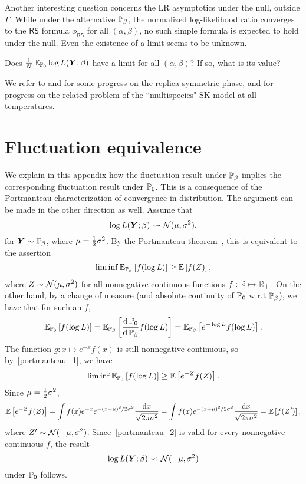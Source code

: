 \documentclass[final,12pt]{colt2018} %
\newcommand{\RS}{\mathsf{RS}} %
\newcommand{\Y}{\bm{Y}}
\begin{document}
 
 Another interesting question concerns the LR asymptotics under the null, outside $\Gamma$. While under the alternative $\P_{\beta}$, the normalized log-likelihood ratio converges to the $\RS$ formula $\phi_{\RS}$ for all $(\alpha,\beta)$, no such simple formula is expected to hold under the null. Even the existence of a limit seems to be unknown. 
\begin{question}\label{our_question}
Does $\frac{1}{N}\E_{\P_{0}}\log L(\Y;\beta)$ have a limit for all $(\alpha,\beta)$? If so, what is its value? 
\end{question}
We refer to \cite{barra2011equilibrium,barra2014mean} and \cite{auffinger2014free} for some progress on the replica-symmetric phase, and \cite{panchenko2015multispecies} for progress on the related problem of the ``multispecies" SK model at all temperatures.







\appendix

\section{Fluctuation equivalence}
\label{sxn:fluctuation_equivalence}
We explain in this appendix how the fluctuation result under $\P_{\beta}$ implies the corresponding fluctuation result under $\P_{0}$. This is a consequence of the Portmanteau characterization of convergence in distribution. The argument can be made in the other direction as well. Assume that 
\[\log L(\Y;\beta) \rightsquigarrow \normal(\mu,\sigma^2),\]
 for $\Y \sim \P_{\beta}$, where $\mu = \half\sigma^2$.   
By the Portmanteau theorem~\citep[Lemma 2.2]{vandervaart2000asymptotic}, this is equivalent to the assertion
\begin{equation}\label{portmanteau_1}
 \liminf \E_{\P_{\beta}}\left[f(\log L)\right] \ge \E\left[f(Z)\right],
 \end{equation}
where $Z \sim \normal(\mu,\sigma^2)$ for all nonnegative continuous functions $f:\R \mapsto \Rp$. On the other hand, by a change of measure (and absolute continuity of $\P_{0}$ w.r.t $\P_{\beta}$), we have that for such an $f$,
\[\E_{\P_{0}}\left[f(\log L)\right] = \E_{\P_{\beta}}\left[ \frac{\rmd \P_{0}}{\rmd \P_{\beta}}  f(\log L)\right] = \E_{\P_{\beta}}\left[e^{-\log L}  f(\log L)\right].\]
The function $g:x\mapsto e^{-x}f(x)$ is still nonnegative continuous, so by~\eqref{portmanteau_1}, we have
\begin{equation}\label{portmanteau_2}
\liminf \E_{\P_{0}}\left[f(\log L)\right] \ge \E\left[e^{-Z}f(Z)\right].
\end{equation}
Since $\mu = \half\sigma^2$, 
\[\E\left[e^{-Z}f(Z)\right] = \int f(x)e^{-x}  e^{-(x-\mu)^2/2\sigma^2}\frac{\rmd x}{\sqrt{2 \pi \sigma^2}} = \int f(x) e^{-(x+\mu)^2/2\sigma^2}\frac{\rmd x}{\sqrt{2 \pi \sigma^2}} = \E\left[f(Z')\right],\]  
where $Z' \sim \normal(-\mu,\sigma^2)$. Since~\eqref{portmanteau_2} is valid for every nonnegative continuous $f$, the result 
\[\log L(\Y;\beta) \rightsquigarrow \normal(-\mu,\sigma^2)\]
under $\P_{0}$ follows. 
\end{document}
